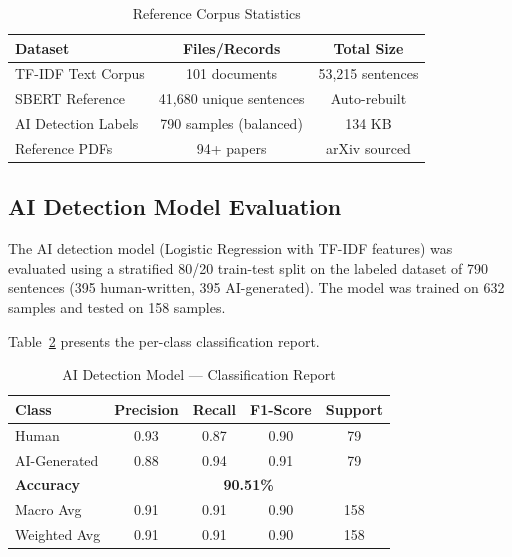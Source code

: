 \documentclass[conference]{IEEEtran}
\begin{document}
\begin{table}[htbp]
\caption{Reference Corpus Statistics}
\begin{center}
\begin{tabular}{|l|c|c|}
\hline
\textbf{Dataset} & \textbf{Files/Records} & \textbf{Total Size} \\
\hline
TF-IDF Text Corpus & 101 documents & 53,215 sentences \\
\hline
SBERT Reference & 41,680 unique sentences & Auto-rebuilt \\
\hline
AI Detection Labels & 790 samples (balanced) & 134 KB \\
\hline
Reference PDFs & 94+ papers & arXiv sourced \\
\hline
\end{tabular}
\label{tab_corpus}
\end{center}
\end{table}

\subsection{AI Detection Model Evaluation}

The AI detection model (Logistic Regression with TF-IDF features) was evaluated using a stratified 80/20 train-test split on the labeled dataset of 790 sentences (395 human-written, 395 AI-generated). The model was trained on 632 samples and tested on 158 samples.

Table~\ref{tab_ai_results} presents the per-class classification report.

\begin{table}[htbp]
\caption{AI Detection Model --- Classification Report}
\begin{center}
\begin{tabular}{|l|c|c|c|c|}
\hline
\textbf{Class} & \textbf{Precision} & \textbf{Recall} & \textbf{F1-Score} & \textbf{Support} \\
\hline
Human & 0.93 & 0.87 & 0.90 & 79 \\
\hline
AI-Generated & 0.88 & 0.94 & 0.91 & 79 \\
\hline
\hline
\textbf{Accuracy} & \multicolumn{4}{c|}{\textbf{90.51\%}} \\
\hline
Macro Avg & 0.91 & 0.91 & 0.90 & 158 \\
\hline
Weighted Avg & 0.91 & 0.91 & 0.90 & 158 \\
\hline
\end{tabular}
\label{tab_ai_results}
\end{center}
\end{table}
\end{document}
